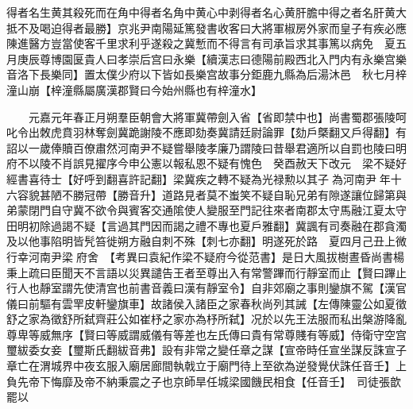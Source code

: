 得者名生黄其殺死而在角中得者名角中黄心中剥得者名心黄肝膽中得之者名肝黄大抵不及喝迫得者最勝】京兆尹南陽延篤發書收客曰大將軍椒房外家而皇子有疾必應陳進醫方豈當使客千里求利乎遂殺之冀慙而不得言有司承旨求其事篤以病免　夏五月庚辰尊博園匽貴人曰孝崇后宫曰永樂【續漢志曰德陽前殿西北入門内有永樂宫樂音洛下長樂同】置太僕少府以下皆如長樂宫故事分鉅鹿九縣為后湯沐邑　秋七月梓潼山崩【梓潼縣屬廣漢郡賢曰今始州縣也有梓潼水】

　　元嘉元年春正月朔羣臣朝會大將軍冀帶劍入省【省即禁中也】尚書蜀郡張陵呵叱令出敇虎賁羽林奪劍冀跪謝陵不應即劾奏冀請廷尉論罪【劾戶槩翻又戶得翻】有詔以一歲俸贖百僚肅然河南尹不疑嘗舉陵孝廉乃謂陵曰昔舉君適所以自罰也陵曰明府不以陵不肖誤見擢序今申公憲以報私恩不疑有愧色　癸酉赦天下改元　梁不疑好經書喜待士【好呼到翻喜許記翻】梁冀疾之轉不疑為光禄勲以其子為河南尹年十六容貌甚陋不勝冠帶【勝音升】道路見者莫不蚩笑不疑自恥兄弟有隙遂讓位歸第與弟蒙閉門自守冀不欲令與賓客交通隂使人變服至門記往來者南郡太守馬融江夏太守田明初除過謁不疑【言過其門因而謁之禮不專也夏戶雅翻】冀諷有司奏融在郡貪濁及以他事陷明皆髠笞徙朔方融自刺不殊【刺七亦翻】明遂死於路　夏四月己丑上微行幸河南尹梁府舍　【考異曰袁紀作梁不疑府今從范書】是日大風拔樹晝昏尚書楊秉上疏曰臣聞天不言語以災異譴告王者至尊出入有常警蹕而行靜室而止【賢曰蹕止行人也靜室謂先使清宫也前書音義曰漢有靜室令】自非郊廟之事則鑾旗不駕【漢官儀曰前驅有雲䍐皮軒鑾旗車】故諸侯入諸臣之家春秋尚列其誡【左傳陳靈公如夏徵舒之家為徵舒所弑齊莊公如崔杼之家亦為杼所弑】况於以先王法服而私出槃游降亂尊卑等威無序【賢曰等威謂威儀有等差也左氏傳曰貴有常尊賤有等威】侍衛守空宫璽紱委女妾【璽斯氏翻紱音弗】設有非常之變任章之謀【宣帝時任宣坐謀反誅宣子章亡在渭城界中夜玄服入廟居廊間執戟立于廟門待上至欲為逆發覺伏誅任音壬】上負先帝下悔靡及帝不納秉震之子也京師旱任城梁國饑民相食【任音壬】　司徒張歆罷以

